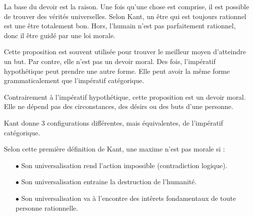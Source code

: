 \documentclass[11pt]{article}
\begin{document}
La base du devoir est la raison. Une fois qu'une chose est comprise, il est possible de trouver des vérités universelles. Selon Kant, un être qui est toujours rationnel est une être totalement bon. Hors, l'humain n'est pas parfaitement rationnel, donc il être guidé par une loi morale.


Cette proposition est souvent utilisée pour trouver le meilleur moyen d'atteindre un but. Par contre, elle n'est pas un devoir moral. Des fois, l'impératif hypothétique peut prendre une autre forme. Elle peut avoir la même forme grammaticalement que l'impératif catégorique.


Contrairement à l'impératif hypothétique, cette proposition est un devoir moral. Elle ne dépend pas des circonstances, des désirs ou des buts d'une personne.


Kant donne 3 configurations différentes, mais équivalentes, de l'impératif catégorique.



Selon cette première définition de Kant, une maxime n'est pas morale si :
\begin{itemize}
\item[$\bullet$] Son universalisation rend l'action impossible (contradiction logique).
\item[] 
\item[$\bullet$] Son universalisation entraine la destruction de l'humanité.
\item[$\bullet$] Son universalisation va à l'encontre des intêrets fondamentaux de toute personne rationnelle.
\end{itemize}
\end{document}
